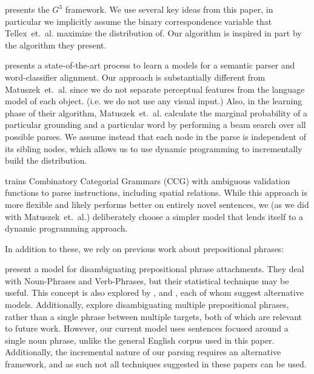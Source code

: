 \documentclass[letterpaper,10pt]{article}
\begin{document}
\citet{tellex2011understanding} presents the $G^3$ framework. We use several key ideas from this paper, in particular we implicitly assume the binary correspondence variable that Tellex~et.~al. maximize the distribution of. Our algorithm is inspired in part by the algorithm they present.

\citet{UW_RSE_ICML2012} presents a state-of-the-art process to learn a models for a semantic parser and word-classifier alignment. Our approach is substantially different from Matuszek~et.~al. since we do not separate perceptual features from the language model of each object. (i.e. we do not use any visual input.) Also, in the learning phase of their algorithm, Matuszek~et.~al. calculate the marginal probability of a particular grounding and a particular word by performing a beam search over all possible parses. We assume instead that each node in the parse is independent of its sibling nodes, which allows us to use dynamic programming to incrementally build the distribution.

\citet{artzi2013weakly} trains Combinatory Categorial Grammars (CCG) with ambiguous validation functions to parse instructions, including spatial relations. While this approach is more flexible and likely performs better on entirely novel sentences, we (as we did with Matuszek~et.~al.) deliberately choose a simpler model that lends itself to a dynamic programming approach.


In addition to these, we rely on previous work about prepositional phrases:

\citet{collins95} present a model for disambiguating prepositional phrase attachments. They deal with Noun-Phrases and Verb-Phrases, but their statistical technique may be useful. This concept is also explored by \citet{ratna98}, and \citet{brill94}, each of whom suggest alternative models. Additionally, \citet{merlo97} explore disambiguating multiple prepositional phrases, rather than a single phrase between multiple targets, both of which are relevant to future work. However, our current model uses sentences focused around a single noun phrase, unlike the general English corpus used in this paper. Additionally, the incremental nature of our parsing requires an alternative framework, and as such not all techniques suggested in these papers can be used.
\end{document}
